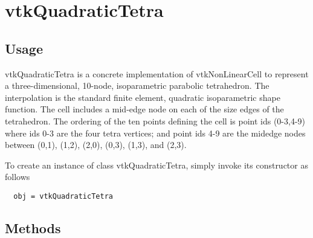 \section{vtkQuadraticTetra}

\subsection{Usage}

 vtkQuadraticTetra is a concrete implementation of vtkNonLinearCell to
 represent a three-dimensional, 10-node, isoparametric parabolic
 tetrahedron. The interpolation is the standard finite element, quadratic
 isoparametric shape function. The cell includes a mid-edge node on each of
 the size edges of the tetrahedron. The ordering of the ten points defining
 the cell is point ids (0-3,4-9) where ids 0-3 are the four tetra
 vertices; and point ids 4-9 are the midedge nodes between (0,1), (1,2),
 (2,0), (0,3), (1,3), and (2,3).


To create an instance of class vtkQuadraticTetra, simply
invoke its constructor as follows
\begin{verbatim}
  obj = vtkQuadraticTetra
\end{verbatim}
\subsection{Methods}

